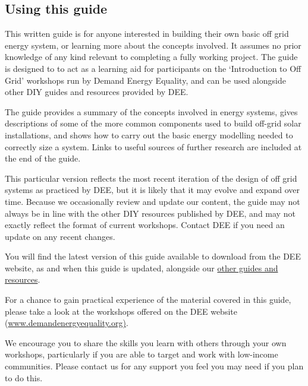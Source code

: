 \documentclass{article}
\theoremstyle{definition}
\theoremstyle{definition}
\theoremstyle{remark}
\begin{document}
  
  \subsection{Using this guide} %
  \label{sub:using_this_guide}

    This written guide is for anyone interested in building their own basic off grid energy system, or learning more about the concepts involved. It assumes no prior knowledge of any kind relevant to completing a fully working project. The guide is designed to to act as a learning aid for participants on the ‘Introduction to Off Grid’ workshops run by Demand Energy Equality, and can be used alongside other DIY guides and resources provided by DEE. 

    The guide provides a summary of the concepts involved in energy systems, gives descriptions of some of the more common components used to build off-grid solar installations, and shows how to carry out the basic energy modelling needed to correctly size a system. Links to useful sources of further research are included at the end of the guide.

    This particular version reflects the most recent iteration of the design of off grid systems as practiced by DEE, but it is likely that it may evolve and expand over time.  Because we occasionally review and update our content, the guide may not always be in line with the other DIY resources published by DEE, and may not exactly reflect the format of current workshops. Contact DEE if you need an update on any recent changes. 

    You will find the latest version of this guide available to download from the DEE website, as and when this guide is updated, alongside our \href{https://www.demandenergyequality.org/resources/}{other guides and resources}.

    For a chance to gain practical experience of the material covered in this guide, please take a look at the workshops offered on the DEE website (\href{www.demandenergyequality.org}{www.demandenergyequality.org)}.

    We encourage you to share the skills you learn with others through your own workshops, particularly if you are able to target and work with low-income communities. Please contact us for any support you feel you may need if you plan to do this.

\end{document}
